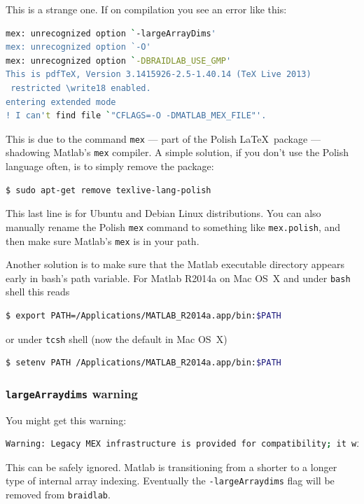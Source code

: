 \documentclass[12pt]{article}
\newcommand{\braidlab}{\texttt{braidlab}}%
\begin{document}
%
This is a strange one.  If on compilation you see an error like this:
\begin{lstlisting}[frame=single,framerule=0pt,escapechar=*,%
  language=bash,backgroundcolor=\color{white}]
mex: unrecognized option `-largeArrayDims'
mex: unrecognized option `-O'
mex: unrecognized option `-DBRAIDLAB_USE_GMP'
This is pdfTeX, Version 3.1415926-2.5-1.40.14 (TeX Live 2013)
 restricted \write18 enabled.
entering extended mode
! I can't find file `"CFLAGS=-O -DMATLAB_MEX_FILE"'.
\end{lstlisting}
This is due to the command \lstinline{mex} --- part of the Polish \LaTeX\
package --- shadowing Matlab's \lstinline{mex} compiler.  A simple solution,
if you don't use the Polish language often, is to simply remove the package:
\begin{lstlisting}[frame=single,framerule=0pt,escapechar=*,%
  language=bash,backgroundcolor=\color{white}]
$ sudo apt-get remove texlive-lang-polish
\end{lstlisting}
This last line is for Ubuntu and Debian Linux distributions.  You can also
manually rename the Polish \lstinline{mex} command to something like
\lstinline{mex.polish}, and then make sure Matlab's \lstinline{mex} is in your
path.

Another solution is to make sure that the Matlab executable directory appears
early in bash's path variable. For Matlab R2014a on Mac OS~X %
% 
and under \lstinline{bash} shell this reads
\begin{lstlisting}[frame=single,framerule=0pt,escapechar=*,%
  language=bash,backgroundcolor=\color{white}]
$ export PATH=/Applications/MATLAB_R2014a.app/bin:$PATH
\end{lstlisting}
or under \lstinline{tcsh} shell (now the default in Mac OS~X) 
\begin{lstlisting}[frame=single,framerule=0pt,escapechar=*,%
  language=bash,backgroundcolor=\color{white}]
$ setenv PATH /Applications/MATLAB_R2014a.app/bin:$PATH
\end{lstlisting}

%

\subsubsection{\lstinline{largeArraydims} warning}

You might get this warning:
\begin{lstlisting}[frame=single,framerule=0pt,escapechar=*,%
  language=bash,backgroundcolor=\color{white}]
Warning: Legacy MEX infrastructure is provided for compatibility; it will be removed in a future version of MATLAB.
\end{lstlisting}
This can be safely ignored.  Matlab is transitioning from a shorter to a
longer type of internal array indexing.  Eventually the
\lstinline{-largeArraydims} flag will be removed from \braidlab.
\end{document}
